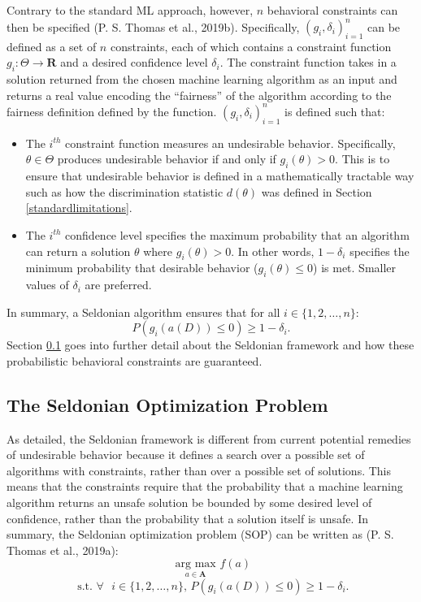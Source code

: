 \documentclass[12pt, twoside]{amherstthesis}
\begin{document}
Contrary to the standard ML approach, however, \(n\) behavioral constraints can then be specified (P. S. Thomas et al., 2019b). Specifically, \((g_i, \delta_i)_{i=1}^{n}\) can be defined as a set of \(n\) constraints, each of which contains a constraint function \(g_i: \Theta \rightarrow \textbf{R}\) and a desired confidence level \(\delta_i\). The constraint function takes in a solution returned from the chosen machine learning algorithm as an input and returns a real value encoding the ``fairness'' of the algorithm according to the fairness definition defined by the function. \((g_i, \delta_i)_{i=1}^{n}\) is defined such that:
\begin{itemize}
\item
  The \(i^{th}\) constraint function measures an undesirable behavior. Specifically, \(\theta \in \Theta\) produces undesirable behavior if and only if \(g_i(\theta) > 0\). This is to ensure that undesirable behavior is defined in a mathematically tractable way such as how the discrimination statistic \(d(\theta)\) was defined in Section \ref{standardlimitations}.
\item
  The \(i^{th}\) confidence level specifies the maximum probability that an algorithm can return a solution \(\theta\) where \(g_i(\theta) > 0\). In other words, \(1 - \delta_i\) specifies the minimum probability that desirable behavior (\(g_i(\theta) \leq 0\)) is met. Smaller values of \(\delta_i\) are preferred.
\end{itemize}
In summary, a Seldonian algorithm ensures that for all \(i \in \{1,2,\ldots,n\}\):
\begin{equation}
\label{ch2eq6}
P(g_i(a(D)) \leq 0) \geq 1 - \delta_i.
\end{equation}
Section \ref{sop} goes into further detail about the Seldonian framework and how these probabilistic behavioral constraints are guaranteed.

\hypertarget{sop}{%
\subsection{The Seldonian Optimization Problem}\label{sop}}

As detailed, the Seldonian framework is different from current potential remedies of undesirable behavior because it defines a search over a possible set of algorithms with constraints, rather than over a possible set of solutions. This means that the constraints require that the probability that a machine learning algorithm returns an unsafe solution be bounded by some desired level of confidence, rather than the probability that a solution itself is unsafe. In summary, the Seldonian optimization problem (SOP) can be written as (P. S. Thomas et al., 2019a):
\begin{equation}
\label{ch2eq7}
\underset{a \in \textbf{A}}{\text{ arg max }} f(a)
\end{equation}
\[\text{ s.t. } \forall \text{ } i \in \{1, 2, \ldots, n\} \text{, } P(g_i(a(D)) \leq 0) \geq 1 - \delta_i.\]
\end{document}
